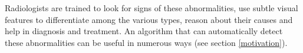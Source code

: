 \documentclass[12pt,oneside,a4paper]{report}
\begin{document}
Radiologists are trained to look for signs of these abnormalities, use subtle
visual features to differentiate among the various types, reason about their
causes and help in diagnosis and treatment. An algorithm that can automatically
detect these abnormalities can be useful in numerous ways (see section
\ref{motivation}).\\
\end{document}

